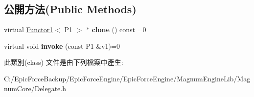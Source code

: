 \subsection*{公開方法(Public Methods)}
\begin{DoxyCompactItemize}
\item 
virtual \hyperlink{class_magnum_1_1_functor1}{Functor1}$<$ P1 $>$ $\ast$ {\bfseries clone} () const  =0\hypertarget{class_magnum_1_1_functor1_a3975dfdc006b77688854a8fa2b5a4cbc}{}\label{class_magnum_1_1_functor1_a3975dfdc006b77688854a8fa2b5a4cbc}

\item 
virtual void {\bfseries invoke} (const P1 \&v1)=0\hypertarget{class_magnum_1_1_functor1_a5586977049577e7f82eb3137268bf04b}{}\label{class_magnum_1_1_functor1_a5586977049577e7f82eb3137268bf04b}

\end{DoxyCompactItemize}


此類別(class) 文件是由下列檔案中產生\+:\begin{DoxyCompactItemize}
\item 
C\+:/\+Epic\+Force\+Backup/\+Epic\+Force\+Engine/\+Epic\+Force\+Engine/\+Magnum\+Engine\+Lib/\+Magnum\+Core/Delegate.\+h\end{DoxyCompactItemize}
